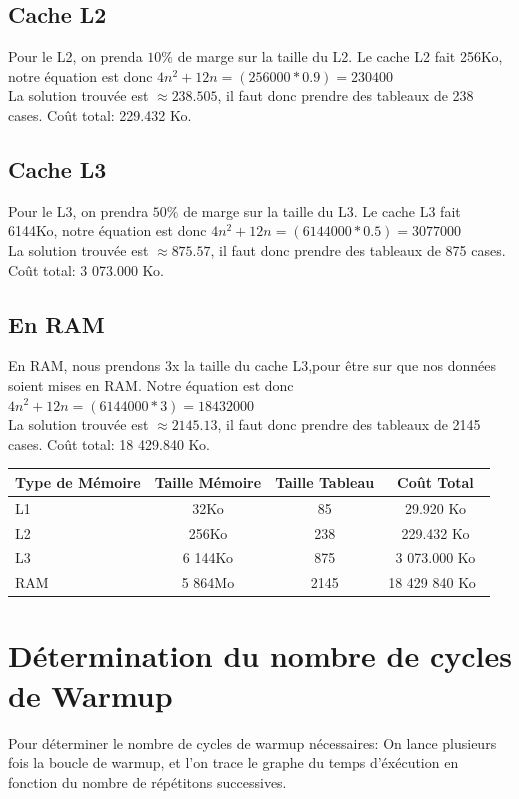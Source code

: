 \documentclass{report}
\begin{document}
\subsection*{Cache L2}
Pour le L2, on prenda $10\%$ de marge sur la taille du L2.
Le cache L2 fait 256Ko, notre équation est donc $4n^2+12n=(256 000*0.9)=230 400$\\
La solution trouvée est $\approx 238.505$, il faut donc prendre des tableaux de 238 cases. Coût total: 229.432 Ko.\\

\subsection*{Cache L3}
Pour le L3, on prendra $50\%$ de marge sur la taille du L3.
Le cache L3 fait 6144Ko, notre équation est donc $4n^2+12n=(6 144 000*0.5)= 3 077 000$\\
La solution trouvée est $\approx 875.57$, il faut donc prendre des tableaux de 875 cases. Coût total: 3 073.000 Ko.\\

\subsection*{En RAM}
En RAM, nous prendons 3x la taille du cache L3,pour être sur que nos données soient mises en RAM.
Notre équation est donc $4n^2+12n=(6 144 000*3)=18 432 000$\\
La solution trouvée est $\approx 2145.13$, il faut donc prendre des tableaux de 2145 cases. Coût total: 18 429.840 Ko.\\

\begin{tabular}{ l c | c c }
    Type de Mémoire & Taille Mémoire & Taille Tableau & Coût Total\\\hline
    L1 & 32Ko & 85 & 29.920 Ko\\ 
    L2 & 256Ko & 238 & 229.432 Ko \\
    L3 & 6 144Ko & 875 & 3 073.000 Ko \\
    RAM & 5 864Mo & 2145 & 18 429 840 Ko \\
\end{tabular}

\section*{Détermination du nombre de cycles de Warmup}

Pour déterminer le nombre de cycles de warmup nécessaires: On lance plusieurs fois la boucle de warmup, et l'on trace le graphe du temps d'éxécution en fonction du nombre de répétitons successives.
\end{document}
